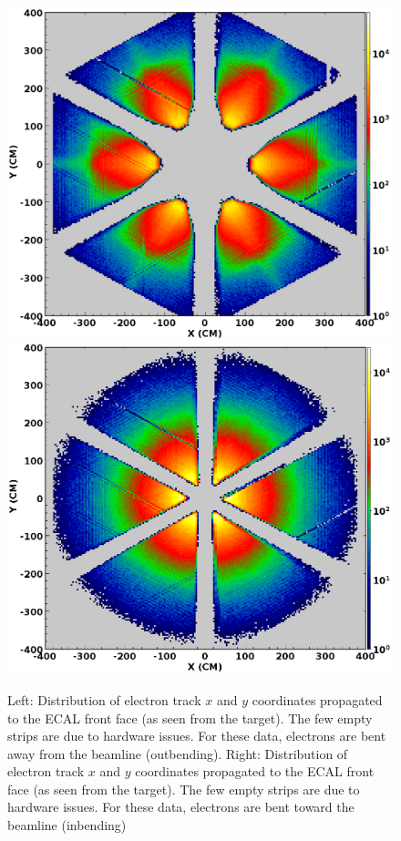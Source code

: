 \documentclass[final,3p,twocolumn]{elsarticle}
\begin{document}
\begin{figure}[t!]
\centerline{\includegraphics[width=0.95\columnwidth]{e-outbending.png}
\hspace{1cm}\includegraphics[width=0.95\columnwidth]{e-inbending.png}}
\caption{Left: Distribution of electron track $x$ and $y$ coordinates propagated to the ECAL front face (as seen from
  the target). The few empty strips are due to hardware issues. For these data, electrons are bent away from the
  beamline (outbending). Right: Distribution of electron track $x$ and $y$ coordinates propagated to the ECAL front face 
  (as seen from the target). The few empty strips are due to hardware issues. For these data, electrons are bent toward the
  beamline (inbending)} 
\label{electrons-xy}
\end{figure}
\end{document}
